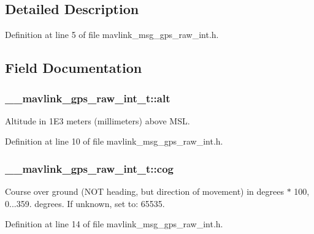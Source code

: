 \subsection{Detailed Description}


Definition at line 5 of file mavlink\-\_\-msg\-\_\-gps\-\_\-raw\-\_\-int.\-h.



\subsection{Field Documentation}
\hypertarget{struct____mavlink__gps__raw__int__t_a00fe92144cfdaf8440a841493e5b6e99}{
\subsubsection[{alt}]{ \-\_\-\-\_\-mavlink\-\_\-gps\-\_\-raw\-\_\-int\-\_\-t\-::alt}}\label{struct____mavlink__gps__raw__int__t_a00fe92144cfdaf8440a841493e5b6e99}


Altitude in 1\-E3 meters (millimeters) above M\-S\-L. 



Definition at line 10 of file mavlink\-\_\-msg\-\_\-gps\-\_\-raw\-\_\-int.\-h.

\hypertarget{struct____mavlink__gps__raw__int__t_adbe4dfbea17d1fd08a0841ce29e32637}{
\subsubsection[{cog}]{ \-\_\-\-\_\-mavlink\-\_\-gps\-\_\-raw\-\_\-int\-\_\-t\-::cog}}\label{struct____mavlink__gps__raw__int__t_adbe4dfbea17d1fd08a0841ce29e32637}


Course over ground (N\-O\-T heading, but direction of movement) in degrees $\ast$ 100, 0...359. degrees. If unknown, set to\-: 65535. 



Definition at line 14 of file mavlink\-\_\-msg\-\_\-gps\-\_\-raw\-\_\-int.\-h.

